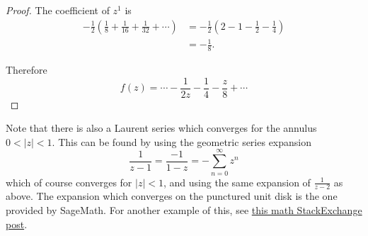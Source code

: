 \documentclass{article}
\begin{document}
\begin{enumerate}
\begin{proof}
		The coefficient of $z^1$ is
		\begin{align*}
			-\frac{1}{2} \left ( \frac{1}{8} + \frac{1}{16} + \frac{1}{32} + \cdots \right ) &= - \frac{1}{2} \left ( 2 - 1 - \frac{1}{2} - \frac{1}{4} \right )\\
			&= - \frac{1}{8}.
		\end{align*}
		 
		Therefore \[ f(z) = \cdots - \frac{1}{2z} - \frac{1}{4} - \frac{z}{8} + \cdots \]
	\end{proof}
	
Note that there is also a Laurent series which converges for the annulus $0 < |z| < 1$. This can be found by using the geometric series expansion \[\frac{1}{z-1} = \frac{-1}{1-z} = - \sum_{n=0}^\infty z^n\] which of course converges for $|z|< 1$, and using the same expansion of $\frac{1}{z-2}$ as above. The expansion which converges on the punctured unit disk is the one provided by SageMath. For another example of this, see \href{https://math.stackexchange.com/questions/2553132/laurent-series-for-different-domains}{this math StackExchange post}.

	

\end{enumerate}
\end{document}
